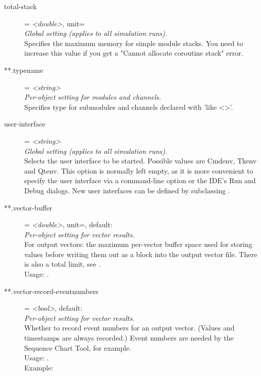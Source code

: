 \begin{description}
\item[total-stack] = \textit{<double>}, unit=\\
    \textit{Global setting (applies to all simulation runs).}\\
    Specifies the maximum memory for  simple module stacks. You
    need to increase this value if you get a "Cannot allocate coroutine stack"
    error.
\item[**.typename] = \textit{<string>}\\
    \textit{Per-object setting for modules and channels.}\\
    Specifies type for submodules and channels declared with 'like <>'.
\item[user-interface] = \textit{<string>}\\
    \textit{Global setting (applies to all simulation runs).}\\
    Selects the user interface to be started. Possible values are Cmdenv, Tkenv
    and Qtenv. This option is normally left empty, as it is more convenient to
    specify the user interface via a command-line option or the IDE's Run and
    Debug dialogs. New user interfaces can be defined by subclassing
    .
\item[**.vector-buffer] = \textit{<double>}, unit=, default: \\
    \textit{Per-object setting for vector results.}\\
    For output vectors: the maximum per-vector buffer space used for storing
    values before writing them out as a block into the output vector file.
    There is also a total limit, see
    .\\Usage:
    .
\item[**.vector-record-eventnumbers] = \textit{<bool>}, default: \\
    \textit{Per-object setting for vector results.}\\
    Whether to record event numbers for an output vector. (Values and
    timestamps are always recorded.) Event numbers are needed by the Sequence
    Chart Tool, for example.\\Usage:
    .\\Example:

\end{description}

